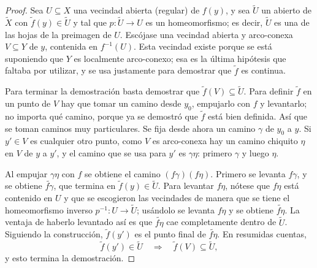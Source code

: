 \documentclass[11pt]{article}
\begin{document}
\begin{proof}
Sea $U\subseteq X$ una vecindad abierta (regular) de $f(y)$, y sea $\tilde U$ un abierto de $\tilde X$ con $\tilde f(y)\in\tilde U$ y tal que $p\colon\tilde U\to U$ es un homeomorfismo; es decir, $\tilde U$ es una de las hojas de la preimagen de $U$. Escójase una vecindad abierta y arco-conexa $V\subseteq Y$ de $y$, contenida en $f^{-1}(U)$. Esta vecindad existe porque se está suponiendo que $Y$ es localmente arco-conexo; esa es la última hipótesis que faltaba por utilizar, y se usa justamente para demostrar que $\tilde f$ es continua.

Para terminar la demostración basta demostrar que $\tilde f(V)\subseteq\tilde U$. Para definir $\tilde f$ en un punto de $V$ hay que tomar un camino desde $y_0$, empujarlo con $f$ y levantarlo; no importa qué camino, porque ya se demostró que $\tilde f$ está bien definida. Así que se toman caminos muy particulares. Se fija desde ahora un camino $\gamma$ de $y_0$ a $y$. Si $y'\in V$ es cualquier otro punto, como $V$ es arco-conexa hay un camino chiquito $\eta$ en $V$ de $y$ a $y'$, y el camino que se usa para $y'$ es $\gamma\eta$: primero $\gamma$ y luego $\eta$.

Al empujar $\gamma\eta$ con $f$ se obtiene el camino $(f\gamma)(f\eta)$. Primero se levanta $f\gamma$, y se obtiene $\widetilde{f\gamma}$, que termina en $\tilde f(y)\in\tilde U$. Para levantar $f\eta$, nótese que $f\eta$ está contenido en $U$ y que se escogieron las vecindades de manera que se tiene el homeomorfismo inverso $p^{-1}\colon U\to\tilde U$; usándolo se levanta $f\eta$ y se obtiene $\widetilde{f\eta}$. La ventaja de haberlo levantado así es que $\widetilde{f\eta}$ cae completamente dentro de $\tilde U$. Siguiendo la construcción, $\tilde f(y')$ es el punto final de $\widetilde{f\eta}$. En resumidas cuentas,
\[
  \tilde f(y')\in\tilde U\quad\Longrightarrow\quad\tilde f(V)\subseteq\tilde U,
\]
y esto termina la demostración.
\end{proof}
\end{document}
